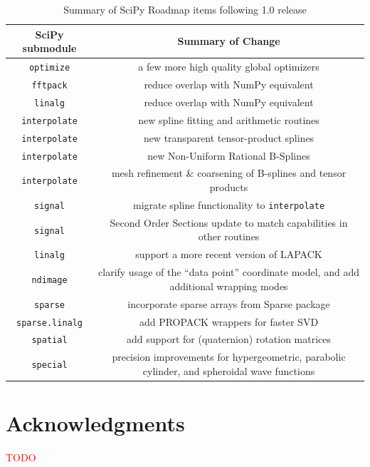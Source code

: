 \documentclass[fleqn,10pt]{wlscirep}
\newcommand{\fixme}[1]{\textcolor{red}{{#1}}}
\begin{document}
\begin{table}[H]
\caption{Summary of SciPy Roadmap items following 1.0 release}
\begin{tabular}{ c|c }
    SciPy submodule & Summary of Change \\
    \hline
    \texttt{optimize} & a few more high quality global optimizers\\
    \texttt{fftpack} & reduce overlap with NumPy equivalent \\
    \texttt{linalg} & reduce overlap with NumPy equivalent \\
    \texttt{interpolate} & new spline fitting and arithmetic routines \\
    \texttt{interpolate} & new transparent tensor-product splines\\
    \texttt{interpolate} & new Non-Uniform Rational B-Splines\\
    \texttt{interpolate} & mesh refinement \& coarsening of B-splines and tensor products\\
    \texttt{signal} & migrate spline functionality to \texttt{interpolate}\\
    \texttt{signal} & Second Order Sections update to match capabilities in other routines\\
    \texttt{linalg} & support a more recent version of LAPACK\\
    \texttt{ndimage} & clarify usage of the ``data point'' coordinate
    model, and add additional wrapping modes\\
    \texttt{sparse} & incorporate sparse arrays from Sparse package\cite{abbasi2018sparse} \\
    \texttt{sparse.linalg} & add PROPACK wrappers for faster SVD\\
    \texttt{spatial} & add support for (quaternion) rotation matrices\\
    \texttt{special} & precision improvements for hypergeometric, parabolic cylinder, and spheroidal wave functions\\
\end{tabular}\label{table:roadmap}
\end{table}



\section*{Acknowledgments}

\fixme{TODO}

\end{document}
